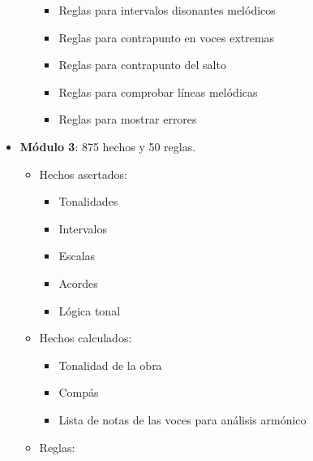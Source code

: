 \begin{itemize}
\begin{itemize}
\begin{itemize}
				\item Reglas para intervalos disonantes melódicos

				\item Reglas para contrapunto en voces extremas

				\item Reglas para contrapunto del salto

				\item Reglas para comprobar líneas melódicas

				\item Reglas para mostrar errores

			\end{itemize}
			
	\end{itemize}

	\bigskip

	\item \textbf{Módulo 3}: 875 hechos y 50 reglas.

	\begin{itemize}

		\item Hechos asertados:

			\begin{itemize}

				\item Tonalidades

				\item Intervalos

				\item Escalas

				\item Acordes

				\item Lógica tonal

			\end{itemize}

		\item Hechos calculados:

			\begin{itemize}

				\item Tonalidad de la obra

				\item Compás

				\item Lista de notas de las voces para análisis armónico

			\end{itemize}

		\item Reglas:


\end{itemize}
\end{itemize}
